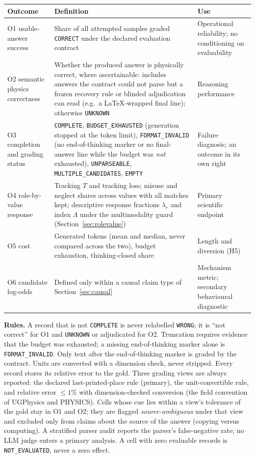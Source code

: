 \documentclass[10pt,a4paper]{article}
\newcommand{\NE}{\texttt{NOT\_EVALUATED}}
\begin{document}
\begin{center}\small
\begin{tabularx}{\linewidth}{@{}P{3.6cm}LP{3.6cm}@{}}
\toprule
Outcome & Definition & Use \\
\midrule
O1 usable-answer success & Share of all attempted samples graded \texttt{CORRECT} under the declared evaluation contract & Operational reliability; no conditioning on evaluability \\
O2 semantic physics correctness & Whether the produced answer is physically correct, where ascertainable: includes answers the contract could not parse but a frozen recovery rule or blinded adjudication can read (e.g.\ a LaTeX-wrapped final line); otherwise \texttt{UNKNOWN} & Reasoning performance \\
O3 completion and grading status & \texttt{COMPLETE}, \texttt{BUDGET\_EXHAUSTED} (generation stopped at the token limit), \texttt{FORMAT\_INVALID} (no end-of-thinking marker or no final-answer line while the budget was \emph{not} exhausted), \texttt{UNPARSEABLE}, \texttt{MULTIPLE\_CANDIDATES}, \texttt{EMPTY} & Failure diagnosis; an outcome in its own right \\
O4 role-by-value response & Tracking $T$ and tracking loss; misuse and neglect shares across values with all matches kept; descriptive response fractions $\lambda_r$ and index $\Lambda$ under the multimodality guard (Section~\ref{sec:rolevalue}) & Primary scientific endpoint \\
O5 cost & Generated tokens (mean and median, never compared across the two), budget exhaustion, thinking-closed share & Length and diversion (H5) \\
O6 candidate log-odds & Defined only within a causal claim type of Section~\ref{sec:causal} & Mechanism metric; secondary behavioural diagnostic \\
\bottomrule
\end{tabularx}
\end{center}

\textbf{Rules.} A record that is not \texttt{COMPLETE} is never relabelled \texttt{WRONG}; it is ``not correct''
for O1 and \texttt{UNKNOWN} or adjudicated for O2. Truncation requires evidence that the budget was exhausted; a
missing end-of-thinking marker alone is \texttt{FORMAT\_INVALID}. Only text after the end-of-thinking marker is
graded by the contract. Units are converted with a dimension check, never stripped. Every record stores its
relative error to the gold. Three grading views are always reported: the declared last-printed-place rule
(primary), the unit-convertible rule, and relative error $\le 1\%$ with dimension-checked conversion (the field
convention of UGPhysics and PHYSICS). Cells whose cue lies within a view's tolerance of the gold stay in O1 and O2;
they are flagged \emph{source-ambiguous} under that view and excluded only from claims about the source of the
answer (copying versus computing). A stratified parser audit reports the parser's false-negative rate; no LLM
judge enters a primary analysis. A cell with zero evaluable records is \NE{}, never a zero effect.
\end{document}
